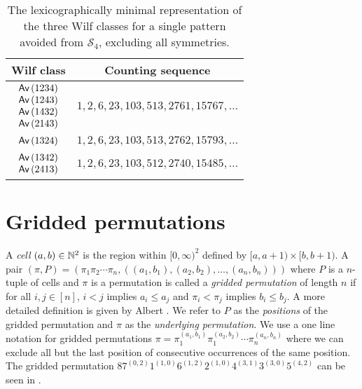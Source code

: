 \begin{table}[ht!]
    \centering
    \begin{tabular}{c|c}
        Wilf class & Counting sequence\\
        \hline
        $\begin{matrix}\textsf{Av}\left(1234\right)\\\textsf{Av}\left(1243\right)\\\textsf{Av}\left(1432\right)\\\textsf{Av}\left(2143\right)\end{matrix}$ & $1, 2, 6, 23, 103, 513, 2761, 15767, \dotsc$ \\
        \hline
        $\begin{matrix}\textsf{Av}\left(1324\right)\end{matrix}$ & $1, 2, 6, 23, 103, 513, 2762, 15793,\dotsc$\\
        \hline
        $\begin{matrix}\textsf{Av}\left(1342\right)\\\textsf{Av}\left(2413\right)\end{matrix}$ & $1, 2, 6, 23, 103, 512, 2740, 15485,\dotsc$
    \end{tabular}
    \caption{The lexicographically minimal representation of the three Wilf classes for a single pattern avoided from $\mathcal{S}_4$, excluding all symmetries.}
    \label{tab:wilfcls4}
\end{table}




\section{Gridded permutations\label{sec:griddedpermutations}}
A \emph{cell} $(a,b) \in \mathbb{N}^2$ is the region within $[0,\infty)^2$ defined by $[a, a+1) \times [b, b+1).$ A pair $(\pi,P) = (\pi_1\pi_2\dotsb\pi_n, ((a_1,b_1),(a_2,b_2),\dotsc,(a_n,b_n)))$ where $P$ is a $n$-tuple of cells and $\pi$ is a permutation is called a \emph{gridded permutation} of length $n$ if for all $i,j \in [n]$, $i<j$ implies $a_i \leq a_j$ and $\pi_i < \pi_j$ implies $b_i \leq b_j$. A more detailed definition is given by Albert \cite{albert2012geometric}. We refer to $P$ as the \emph{positions} of the gridded permutation and $\pi$ as the \emph{underlying permutation}. We use a one line notation for gridded permutations $\pi = \pi_1^{(a_1,b_1)}\pi_1^{(a_2,b_2)}\dotsb\pi_n^{(a_n,b_n)}$ where we can exclude all but the last position of consecutive occurrences of the same position. The gridded permutation $87^{(0,2)}1^{(1,0)}6^{(1,2)}2^{(1,0)}4^{(3,1)}3^{(3,0)}5^{(4,2)}$ can be seen in .

